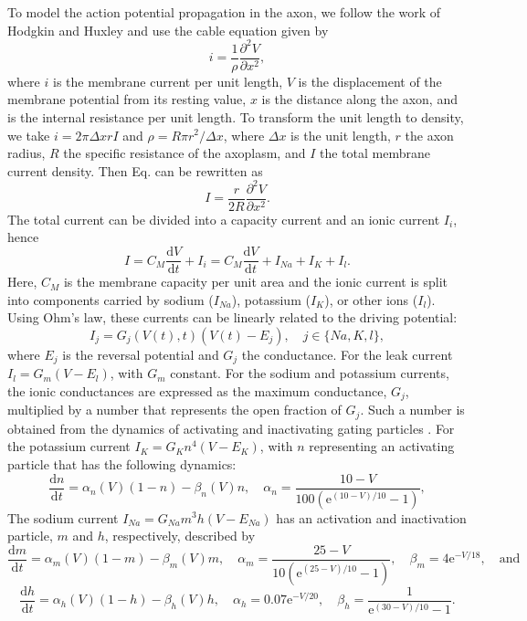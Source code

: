 \documentclass[11pt]{article}
\newcommand{\ee}{\mathrm{e}}
\begin{document}
To model the action potential propagation in the axon, we follow the work of Hodgkin and Huxley \cite{hodgkin1952quantitative} and use the cable equation given by
\begin{equation}\label{eq:i}
    i = \frac{1}{\rho} \frac{\partial^2 V}{\partial x^2},
\end{equation}
where $i$ is the membrane current per unit length, $V$ is the displacement of the membrane potential from its resting value, $x$ is the distance along the axon, and  is the internal resistance per unit length. To transform the unit length to density, we take $i = 2 \pi \Delta x r I$ and $\rho = R \pi r^2/\Delta x$, where $\Delta x$ is the unit length, $r$ the axon radius, $R$ the specific resistance of the axoplasm, and $I$ the total membrane current density. Then Eq.  can be rewritten as
\begin{equation}
    I = \frac{r}{2R} \frac{\partial^2 V}{\partial x^2}.
\end{equation}
The total current can be divided into a capacity current and an ionic current $I_i$, hence
\begin{equation}
    I = C_M \frac{\mathrm{d}V}{\mathrm{d}t} + I_i = C_M \frac{\mathrm{d}V}{\mathrm{d}t} + I_{Na} + I_K + I_l.
\end{equation}
Here, $C_M$ is the membrane capacity per unit area and the ionic current is split into components carried by sodium ($I_{Na}$), potassium ($I_K$), or other ions ($I_l$). Using Ohm’s law, these currents can be linearly related to the driving potential:
\begin{equation}
    I_j = G_j(V(t),t)(V(t)-E_j),  \quad   j \in \{Na,K,l\},
\end{equation}
where $E_j$ is the reversal potential and $G_j$ the conductance. For the leak current $I_l = G_m(V-E_l)$, with $G_m$ constant. For the sodium and potassium currents, the ionic conductances are expressed as the maximum conductance, $G_j$, multiplied by a number that represents the open fraction of $G_j$. Such a number is obtained from the dynamics of activating and inactivating gating particles \cite{hodgkin1952quantitative,koch2004biophysics}. For the potassium current $I_K=G_Kn^4(V-E_K)$, with $n$ representing an activating particle that has the following dynamics: 
\begin{equation}
    \frac{\mathrm{d}n}{\mathrm{d}t} = \alpha_n(V)(1-n) - \beta_n(V)n, \quad \alpha_n = \frac{10-V}{100(\ee^{(10-V)/10}-1)}, %
\end{equation}
The sodium current $I_{Na}= G_{Na}m^3h(V-E_{Na})$ has an activation and inactivation particle, $m$ and $h$, respectively, described by
\begin{equation}
    \frac{\mathrm{d}m}{\mathrm{d}t} = \alpha_m(V)(1-m) - \beta_m(V)m, \quad \alpha_m = \frac{25-V}{10(\ee^{(25-V)/10}-1)}, \quad \beta_m = 4\ee^{-V/18}, \quad \text{and}
\end{equation}
\begin{equation}
    \frac{\mathrm{d}h}{\mathrm{d}t} = \alpha_h(V)(1-h) - \beta_h(V)h, \quad \alpha_h = 0.07\ee^{-V/20}, \quad \beta_h = \frac{1}{\ee^{(30-V)/10}-1}.
\end{equation}
\end{document}
